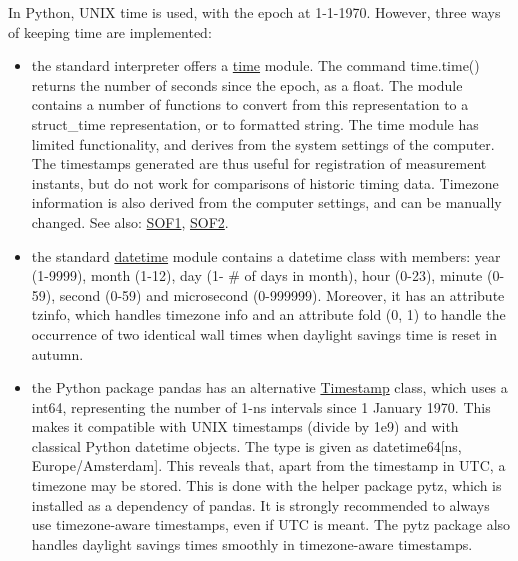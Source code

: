 In Python, UNIX time is used, with the epoch at 1-1-1970. However, three ways of keeping time are implemented:
\begin{itemize}
	\item the standard interpreter offers a \href{https://docs.python.org/3.11/library/time.html}{time} module. The command \textsf{time.time()} returns the number of seconds since the epoch, as a float. The module contains a number of functions to convert from this representation to a \textsf{struct\_time} representation, or to formatted string. The \textsf{time module} has limited functionality, and derives from the system settings of the computer. The timestamps generated are thus useful for registration of measurement instants, but do not work for comparisons of historic timing data. Timezone information is also derived from the computer settings, and can be manually changed. See also: \href{https://stackoverflow.com/questions/7479777/difference-between-python-datetime-vs-time-modules}{SOF1}, \href{https://stackoverflow.com/questions/13890935/does-pythons-time-time-return-the-local-or-utc-timestamp/20035913#20035913}{SOF2}.
	
	\item the standard  \href{https://docs.python.org/3.11/library/datetime.html}{\textsf{datetime}} module contains a \textsf{datetime} class with members: \textsf{year} (1-9999), \textsf{month} (1-12), \textsf{day} (1- \# of days in month), \textsf{hour} (0-23), \textsf{minute} (0-59), \textsf{second} (0-59) and \textsf{microsecond} (0-999999). Moreover, it has an attribute \textsf{tzinfo}, which handles timezone info and an attribute \textsf{fold} (0, 1) to handle the occurrence of two identical wall times when daylight savings time is reset in autumn.
	
	\item the Python package \textsf{pandas} has an alternative \href{https://pandas.pydata.org/pandas-docs/stable/reference/api/pandas.Timestamp.html}{\textsf{Timestamp}} class, which uses a \textsf{int64}, representing the number of 1-ns intervals since 1 January 1970. This makes it compatible with UNIX timestamps (divide by 1e9) and with classical Python datetime objects. The type is given as \textsf{datetime64[ns, Europe/Amsterdam]}. This reveals that, apart from the timestamp in UTC, a timezone may be stored. This is done with the helper package \textsf{pytz}, which is installed as a dependency of \textsf{pandas}. It is strongly recommended to always use timezone-aware timestamps, even if UTC is meant. The pytz package also handles daylight savings times smoothly in timezone-aware timestamps.
	
\end{itemize}




